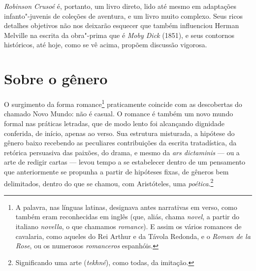 \emph{Robinson Crusoé} é, portanto, um livro direto, lido até mesmo em
adaptações infanto"-juvenis de coleções de aventura, e um livro muito
complexo. Seus ricos detalhes objetivos não nos deixarão esquecer que
também influenciou Herman Melville na escrita da obra"-prima que é
\emph{Moby Dick} (1851), e seus contornos históricos, até hoje, como se
vê acima, propõem discussão vigorosa.



\section{Sobre o gênero}

O surgimento da forma romance\footnote{A palavra, nas línguas latinas,
  designava antes narrativas em verso, como também eram reconhecidas em
  inglês (que, aliás, chama \emph{novel}, a partir do italiano
  \emph{novella}, o que chamamos \emph{romance}). E assim os vários
  romances de cavalaria, como aqueles do Rei Arthur e da Távola Redonda,
  e o \emph{Roman de la Rose}, ou os numerosos \emph{romanceros}
  espanhóis.} praticamente coincide com as descobertas do chamado Novo
Mundo: não é casual. O romance é também um novo mundo formal nas
práticas letradas, que de modo lento foi alcançando dignidade conferida,
de início, apenas ao verso. Sua estrutura misturada, a hipótese do
gênero baixo recebendo as peculiares contribuições da escrita
tratadística, da retórica persuasiva das paixões, do drama, e mesmo da
\emph{ars dictaminis} --- ou a arte de redigir cartas --- levou tempo a
se estabelecer dentro de um pensamento que anteriormente se propunha a
partir de hipóteses fixas, de gêneros bem delimitados, dentro do que se
chamou, com Aristóteles, uma \emph{poética}.\footnote{Significando uma
  arte (\emph{tekhné}), como todas, da imitação.}

